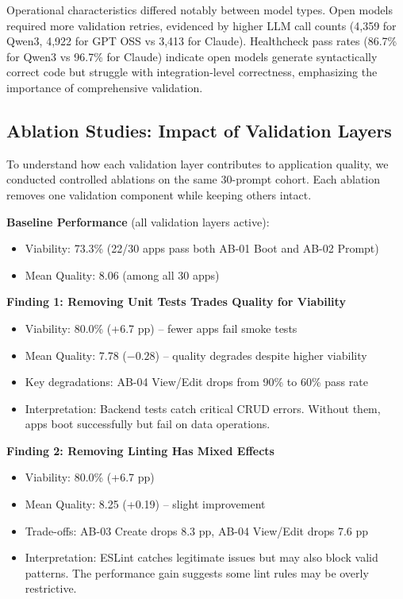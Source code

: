 \documentclass[conference]{IEEEtran}
\begin{document}
Operational characteristics differed notably between model types. Open models required more validation retries, evidenced by higher LLM call counts (4,359 for Qwen3, 4,922 for GPT OSS vs 3,413 for Claude). Healthcheck pass rates (86.7\% for Qwen3 vs 96.7\% for Claude) indicate open models generate syntactically correct code but struggle with integration-level correctness, emphasizing the importance of comprehensive validation.

\subsection{Ablation Studies: Impact of Validation Layers}

To understand how each validation layer contributes to application quality, we conducted controlled ablations on the same 30-prompt cohort. Each ablation removes one validation component while keeping others intact.

\textbf{Baseline Performance} (all validation layers active):
\begin{itemize}
\item Viability: 73.3\% (22/30 apps pass both AB-01 Boot and AB-02 Prompt)
\item Mean Quality: 8.06 (among all 30 apps)
\end{itemize}

\textbf{Finding 1: Removing Unit Tests Trades Quality for Viability}
\begin{itemize}
\item Viability: 80.0\% (+6.7 pp) -- fewer apps fail smoke tests
\item Mean Quality: 7.78 ($-0.28$) -- quality degrades despite higher viability
\item Key degradations: AB-04 View/Edit drops from 90\% to 60\% pass rate
\item Interpretation: Backend tests catch critical CRUD errors. Without them, apps boot successfully but fail on data operations.
\end{itemize}

\textbf{Finding 2: Removing Linting Has Mixed Effects}
\begin{itemize}
\item Viability: 80.0\% (+6.7 pp)
\item Mean Quality: 8.25 (+0.19) -- slight improvement
\item Trade-offs: AB-03 Create drops 8.3 pp, AB-04 View/Edit drops 7.6 pp
\item Interpretation: ESLint catches legitimate issues but may also block valid patterns. The performance gain suggests some lint rules may be overly restrictive.
\end{itemize}
\end{document}
